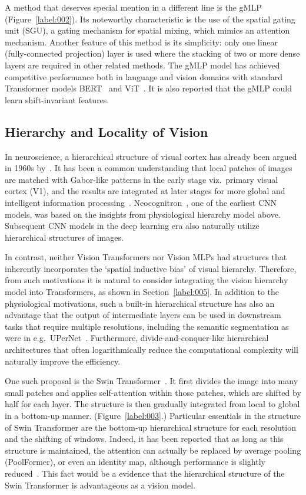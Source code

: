\documentclass{article}
\begin{document}
A method that deserves special mention in a different line is the gMLP~\citep{liu2021pay} (Figure~\ref{label:002}). Its noteworthy characteristic is the use of the spatial gating unit (SGU), a gating mechanism for spatial mixing, which mimics an attention mechanism. Another feature of this method is its simplicity: only one linear (fully-connected projection) layer is used where the stacking of two or more dense layers are required in other related methods. The gMLP model has achieved competitive performance both in language and vision domains with standard Transformer models BERT~\citep{devlin2018bert} and ViT~\citep{dosovitskiy2020image}. It is also reported that the gMLP could learn shift-invariant features. 

\subsection{Hierarchy and Locality of Vision}\label{label:007}
In neuroscience, a hierarchical structure of visual cortex has already been argued in 1960s by~\citet{hubel1962receptive}.
It has been a common understanding that local patches of images are matched with Gabor-like patterns in the early stage viz.\ primary visual cortex (V1), and the results are integrated at later stages for more global and intelligent information processing~\citep{marcelja1980mathematical}. 
Neocognitron~\citep{fukushima1980neocognitron}, one of the earliest CNN models, was based on the insights from physiological hierarchy model above. Subsequent CNN models in the deep learning era also naturally utilize hierarchical structures of images. 

In contrast, neither Vision Transformers nor Vision MLPs had structures that inherently incorporates the `spatial inductive bias' of visual hierarchy.
Therefore, from such motivations it is natural to consider integrating the vision hierarchy model into Transformers, as shown in Section~\ref{label:005}. In addition to the physiological motivations, such a built-in hierarchical structure has also an advantage that the output of intermediate layers can be used in downstream tasks that require multiple resolutions, including the semantic segmentation as were in e.g.\ UPerNet~\citep{xiao2018unified}.
Furthermore, divide-and-conquer-like hierarchical architectures that often logarithmically reduce the computational complexity will naturally improve the efficiency.

One such proposal is the Swin Transformer~\citep{liu2021swin}. It first divides the image into many small patches and applies self-attention within those patches, which are shifted by half for each layer. The structure is then gradually integrated from local to global in a bottom-up manner.
(Figure~\ref{label:003}.)
Particular essentials in the structure of Swin Transformer are the bottom-up hierarchical structure for each resolution and the shifting of windows. Indeed, it has been reported that as long as this structure is maintained, the attention can actually be replaced by average pooling (PoolFormer), or even an identity map, although performance is slightly reduced~\citep{yu2021metaformer}. This fact would be a evidence that the hierarchical structure of the Swin Transformer is advantageous as a vision model.
\end{document}
